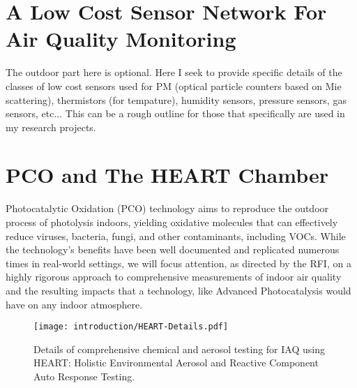 



\section{A Low Cost Sensor Network For Air Quality Monitoring}
The outdoor part here is optional. Here I seek to provide specific details of the classes of low cost sensors used for PM (optical particle counters based on Mie scattering), thermistors (for tempature), humidity sensors, pressure sensors, gas sensors, etc... This can be a rough outline for those that specifically are used in my research projects.



\section{PCO and The HEART Chamber}



Photocatalytic Oxidation (PCO) technology aims to reproduce the outdoor process of photolysis indoors, yielding oxidative molecules that can effectively reduce viruses, bacteria, fungi, and other contaminants, including VOCs. While the technology’s benefits have been well documented and replicated numerous times in real-world settings, we will focus attention, as directed by the RFI, on a highly rigorous approach to comprehensive measurements of indoor air quality and the resulting impacts that a technology, like Advanced Photocatalysis would have on any indoor atmosphere.

\begin{figure}[h]
  \centering
  \texttt{[image: introduction/HEART-Details.pdf]}
	\caption{Details of comprehensive chemical and aerosol testing for IAQ using HEART: Holistic Environmental Aerosol and Reactive Component Auto Response Testing.}
	\label{Figure.HEART-Details}
\end{figure}


